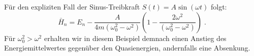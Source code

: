     Für den expliziten Fall der Sinus-Treibkraft $S(t)=A\sin(\omega t)$ folgt:
    \begin{equation}
      \bar H_n = E_n - \frac{A}{4m(\omega_0^2-\omega^2)}\left(1-\frac{2\omega^2}{(\omega_0^2-\omega^2)}\right) \; .
      \label{mittleres_H_sinus}
    \end{equation}
    Für $\omega_0^2>\omega^2$ erhalten wir in diesem Beispiel demnach einen Anstieg des Energiemittelwertes gegenüber den Quasienergien, andernfalls eine Absenkung.



















